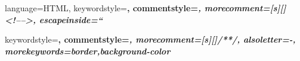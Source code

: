 {
	language=HTML,
	keywordstyle=\color{blue}\bfseries,
	commentstyle=\color{gray}\itshape,
	morecomment=[s][\color{gray}]{<!--}{-->},
	escapeinside=``
}

{
	keywordstyle=\color{cssKeyword}\bfseries,
	commentstyle=\color{gray}\itshape,
	morecomment=[s][\color{gray}]{/*}{*/},
	alsoletter=-,
	morekeywords={border,background-color}
}

\def\jinline{\lstinline[basicstyle=\ttfamily,keywordstyle={}, language=JAVA]}
\def\sinline{\lstinline[basicstyle=\ttfamily,keywordstyle={}, language=SQL]}
